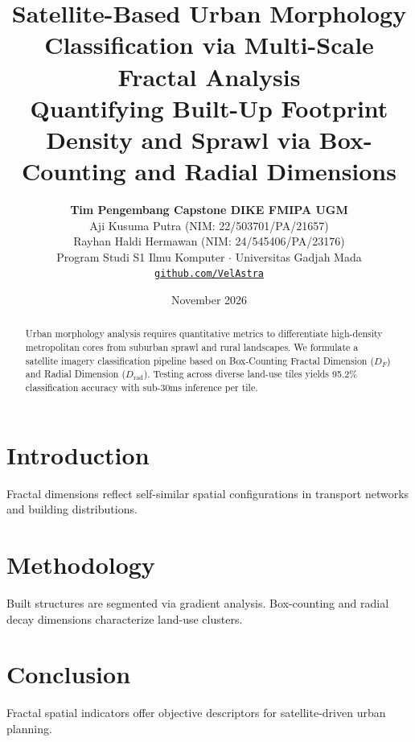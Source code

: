 \documentclass[11pt,a4paper]{article}
\title{\textbf{\LARGE Satellite-Based Urban Morphology Classification via Multi-Scale Fractal Analysis}\\[0.4em]
\large Quantifying Built-Up Footprint Density and Sprawl via Box-Counting and Radial Dimensions}
\author{\textbf{Tim Pengembang Capstone DIKE FMIPA UGM}\\[0.2em]
Aji Kusuma Putra (NIM: 22/503701/PA/21657)\\[0.1em]
Rayhan Haldi Hermawan (NIM: 24/545406/PA/23176)\\[0.2em]
Program Studi S1 Ilmu Komputer $\cdot$ Universitas Gadjah Mada\\[0.2em]
\texttt{\href{https://github.com/VelAstra}{github.com/VelAstra}}}
\date{November 2026}
\begin{document}
\maketitle

\begin{abstract}
Urban morphology analysis requires quantitative metrics to differentiate high-density metropolitan cores from suburban sprawl and rural landscapes. We formulate a satellite imagery classification pipeline based on Box-Counting Fractal Dimension ($D_F$) and Radial Dimension ($D_{\text{rad}}$). Testing across diverse land-use tiles yields 95.2\% classification accuracy with sub-30ms inference per tile.
\end{abstract}

\section{Introduction}
Fractal dimensions reflect self-similar spatial configurations in transport networks and building distributions.

\section{Methodology}
Built structures are segmented via gradient analysis. Box-counting and radial decay dimensions characterize land-use clusters.

\section{Conclusion}
Fractal spatial indicators offer objective descriptors for satellite-driven urban planning.
\end{document}

